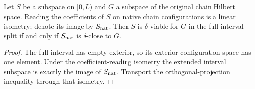 \begin{lemma}
    \label{lem:full_interval_viability}
    \leanok
    Let $S$ be a subspace on $[0,L)$ and $G$ a subspace of the original
    chain Hilbert space. Reading the coefficients of $S$ on native chain
    configurations is a linear isometry; denote its image by $S_{\rm nat}$.
    Then $S$ is $\delta$-viable for $G$ in the full-interval split if and
    only if $S_{\rm nat}$ is $\delta$-close to $G$.
\end{lemma}
\begin{proof}\leanok
    The full interval has empty exterior, so its exterior configuration
    space has one element. Under the coefficient-reading isometry the
    extended interval subspace is exactly the image of $S_{\rm nat}$.
    Transport the orthogonal-projection inequality through that isometry.
\end{proof}

